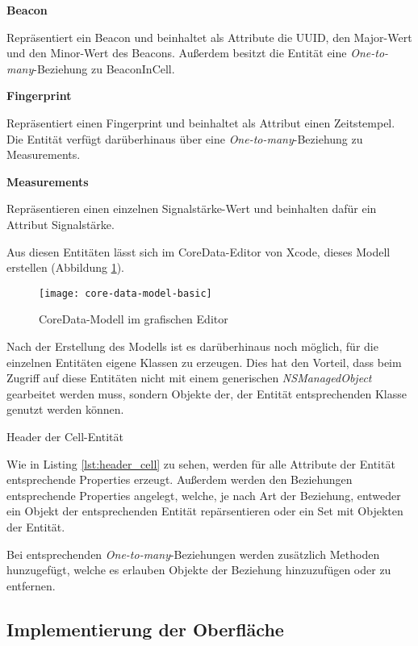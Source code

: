 \textbf{Beacon}

Repräsentiert ein Beacon und beinhaltet als Attribute die UUID, den Major-Wert und den Minor-Wert des Beacons.
Außerdem besitzt die Entität eine \emph{One-to-many}-Beziehung zu BeaconInCell.

\textbf{Fingerprint}

Repräsentiert einen Fingerprint und beinhaltet als Attribut einen Zeitstempel.
Die Entität verfügt darüberhinaus über eine \emph{One-to-many}-Beziehung zu Measurements.


\textbf{Measurements}

Repräsentieren einen einzelnen Signalstärke-Wert und beinhalten dafür ein Attribut Signalstärke.



Aus diesen Entitäten lässt sich im CoreData-Editor von Xcode, dieses Modell erstellen (Abbildung \ref{core-data-model-basic}).

\begin{figure}[htb!]
		\centering
	\texttt{[image: core-data-model-basic]}
	\caption{CoreData-Modell im grafischen Editor}
	\label{core-data-model-basic}
\end{figure}


Nach der Erstellung des Modells ist es darüberhinaus noch möglich, für die einzelnen Entitäten eigene Klassen zu erzeugen. Dies hat den Vorteil, dass beim Zugriff auf diese Entitäten nicht mit einem generischen \emph{NSManagedObject} gearbeitet werden muss, sondern Objekte der, der Entität entsprechenden Klasse genutzt werden können. 

\begin{listing}[htb! breaklines=true]
    \caption{Header der Cell-Entität}
	\label{lst:header_cell}
\end{listing}

Wie in Listing \ref{lst:header_cell} zu sehen, werden für alle Attribute der Entität entsprechende Properties erzeugt. Außerdem werden den Beziehungen entsprechende Properties angelegt, welche, je nach Art der Beziehung, entweder ein Objekt der entsprechenden Entität repärsentieren oder ein Set mit Objekten der Entität.

Bei entsprechenden \emph{One-to-many}-Beziehungen werden zusätzlich Methoden hunzugefügt, welche es erlauben Objekte der Beziehung hinzuzufügen oder zu entfernen.

\subsection{Implementierung der Oberfläche}
\label{sec:}

